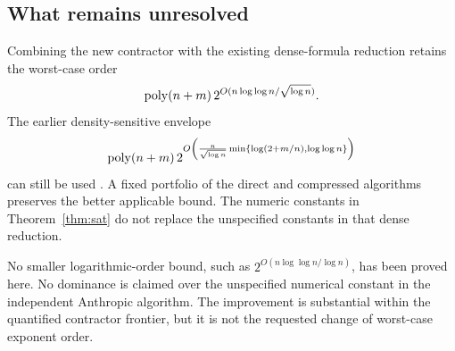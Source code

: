 \subsection{What remains unresolved}

Combining the new contractor with the existing dense-formula reduction
retains the worst-case order
\[
 \operatorname{poly}(n+m)\,2^{O(n\log\log n/\sqrt{\log n})}.
\]
The earlier density-sensitive envelope
\[
 \operatorname{poly}(n+m)\,2^{O\left(\frac n{\sqrt{\log n}}
       \min\{\log(2+m/n),\log\log n\}\right)}
\]
can still be used \cite{density,density2}. A fixed portfolio of the direct
and compressed algorithms preserves the better applicable bound. The
numeric constants in Theorem~\ref{thm:sat} do not replace the unspecified
constants in that dense reduction.

No smaller logarithmic-order bound, such as
$2^{O(n\log\log n/\log n)}$, has been proved here. No dominance is claimed
over the unspecified numerical constant in the independent Anthropic
algorithm. The improvement is substantial within the quantified contractor
frontier, but it is not the requested change of worst-case exponent order.

